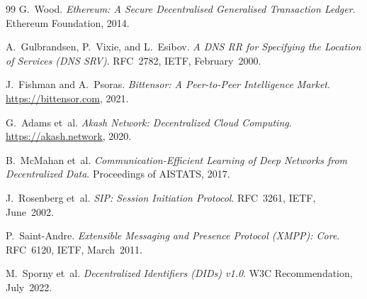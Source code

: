 \documentclass[11pt,a4paper]{article}
\theoremstyle{definition}
\begin{document}
\begin{thebibliography}{99}
G.~Wood.
\textit{Ethereum: A Secure Decentralised Generalised Transaction Ledger}.
Ethereum Foundation, 2014.

A.~Gulbrandsen, P.~Vixie, and L.~Esibov.
\textit{A DNS RR for Specifying the Location of Services (DNS SRV)}.
RFC~2782, IETF, February~2000.

J.~Fishman and A.~Psoras.
\textit{Bittensor: A Peer-to-Peer Intelligence Market}.
\url{https://bittensor.com}, 2021.

G.~Adams et~al.
\textit{Akash Network: Decentralized Cloud Computing}.
\url{https://akash.network}, 2020.

B.~McMahan et~al.
\textit{Communication-Efficient Learning of Deep Networks from Decentralized Data}.
Proceedings of AISTATS, 2017.

J.~Rosenberg et~al.
\textit{SIP: Session Initiation Protocol}.
RFC~3261, IETF, June~2002.

P.~Saint-Andre.
\textit{Extensible Messaging and Presence Protocol (XMPP): Core}.
RFC~6120, IETF, March~2011.

M.~Sporny et~al.
\textit{Decentralized Identifiers (DIDs) v1.0}.
W3C Recommendation, July~2022.

\end{thebibliography}
\end{document}
